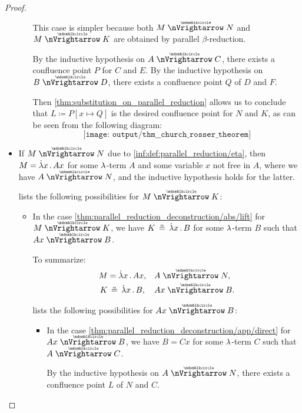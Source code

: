 \begin{proof}
\begin{itemize}
\begin{itemize}
      This case is simpler because both \( M \ppred N \) and \( M \ppred K \) are obtained by parallel \( \beta \)-reduction.

      By the inductive hypothesis on \( A \ppred C \), there exists a confluence point \( P \) for \( C \) and \( E \). By the inductive hypothesis on \( B \ppred D \), there exists a confluence point \( Q \) of \( D \) and \( F \).

      Then \cref{thm:substitution_on_parallel_reduction} allows us to conclude that \( L \coloneqq P[x \mapsto Q] \) is the desired confluence point for \( N \) and \( K \), as can be seen from the following diagram:
      \begin{equation*}
        \texttt{[image: output/thm\_\_church\_rosser\_theorem]}
      \end{equation*}
    \end{itemize}

    \item If \( M \ppred N \) due to \ref{inf:def:parallel_reduction/eta}, then \( M = \qabs x A x \) for some \( {\mathrm \lambda} \)-term \( A \) and some variable \( x \) not free in \( A \), where we have \( A \ppred N \), and the inductive hypothesis holds for the latter.

     lists the following possibilities for \( M \ppred K \):
    \begin{itemize}
      \item In the case \cref{thm:parallel_reduction_deconstruction/abs/lift} for \( M \ppred K \), we have \( K \aequiv \qabs x B \) for some \( {\mathrm \lambda} \)-term \( B \) such that \( Ax \ppred B \).

      To summarize:
      \begin{align*}
        M &= \qabs x A x,     &&A \ppred N, \\
        K &\aequiv \qabs x B, &&Ax \ppred B.
      \end{align*}

       lists the following possibilities for \( Ax \ppred B \):
      \begin{itemize}
        \item In the case \cref{thm:parallel_reduction_deconstruction/app/direct} for \( Ax \ppred B \), we have \( B = Cx \) for some \( {\mathrm \lambda} \)-term \( C \) such that \( A \ppred C \).

        By the inductive hypothesis on \( A \ppred N \), there exists a confluence point \( L \) of \( N \) and \( C \).


\end{itemize}
\end{itemize}
\end{itemize}
\end{proof}
